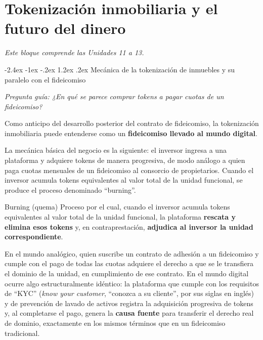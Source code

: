 \documentclass[12pt,oneside]{book}
\makeatletter
\renewcommand\section{\@startsection{section}{1}{\z@}%
  {-2.4ex \@plus -1ex \@minus -.2ex}%
  {1.2ex \@plus .2ex}%
  {\normalfont\Large\bfseries\color{blue!50!black}}}
\newcommand{\guia}[1]{\noindent\textit{Pregunta guía: #1}\par\smallskip}
\newcommand{\alcance}[1]{\noindent\textit{#1}\par\smallskip}
\makeatother
\begin{document}
\chapter[Tokenización inmobiliaria y futuro del dinero]{Tokenización inmobiliaria y el futuro del dinero}

\alcance{Este bloque comprende las Unidades 11 a 13.}

\section{Mecánica de la tokenización de inmuebles y su paralelo con el fideicomiso}

\guia{¿En qué se parece comprar tokens a pagar cuotas de un fideicomiso?}

Como anticipo del desarrollo posterior del contrato de fideicomiso, la tokenización inmobiliaria puede entenderse como un \textbf{fideicomiso llevado al mundo digital}.

La mecánica básica del negocio es la siguiente: el inversor ingresa a una plataforma y adquiere tokens de manera progresiva, de modo análogo a quien paga cuotas mensuales de un fideicomiso al consorcio de propietarios. Cuando el inversor acumula tokens equivalentes al valor total de la unidad funcional, se produce el proceso denominado ``burning''.

\begin{definition}{Burning (quema)}
Proceso por el cual, cuando el inversor acumula tokens equivalentes al valor total de la unidad funcional, la plataforma \textbf{rescata y elimina esos tokens} y, en contraprestación, \textbf{adjudica al inversor la unidad correspondiente}.
\end{definition}

En el mundo analógico, quien suscribe un contrato de adhesión a un fideicomiso y cumple con el pago de todas las cuotas adquiere el derecho a que se le transfiera el dominio de la unidad, en cumplimiento de ese contrato. En el mundo digital ocurre algo estructuralmente idéntico: la plataforma que cumple con los requisitos de ``KYC'' (\textit{know your customer}, ``conozca a su cliente'', por sus siglas en inglés) y de prevención de lavado de activos registra la adquisición progresiva de tokens y, al completarse el pago, genera la \textbf{causa fuente} para transferir el derecho real de dominio, exactamente en los mismos términos que en un fideicomiso tradicional.
\end{document}
